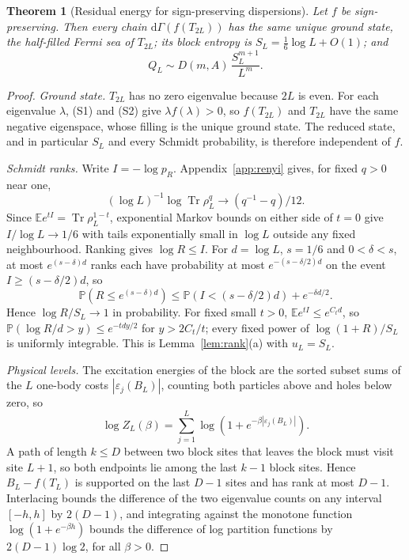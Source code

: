 \documentclass[11pt,a4paper]{article}
\newtheorem{theorem}{Theorem}
\theoremstyle{remark}
\newcommand{\Tr}{\operatorname{Tr}}
\newcommand{\E}{\mathbb E}
\newcommand{\Prob}{\mathbb P}
\newcommand{\dd}{\mathrm d}
\begin{document}
\begin{theorem}[Residual energy for sign-preserving dispersions]\label{thm:general}
Let $f$ be sign-preserving. Then every chain $\dd\Gamma(f(T_{2L}))$ has the same unique ground state, the half-filled Fermi sea of $T_{2L}$; its block entropy is $S_L=\tfrac16\log L+O(1)$; and
\begin{equation}
 Q_L\sim D(m,A)\,\frac{S_L^{m+1}}{L^m}.
 \label{eq:general}
\end{equation}
\end{theorem}
\begin{proof}
\emph{Ground state.} $T_{2L}$ has no zero eigenvalue because $2L$ is even. For each eigenvalue $\lambda$, (S1) and (S2) give $\lambda f(\lambda)>0$, so $f(T_{2L})$ and $T_{2L}$ have the same negative eigenspace, whose filling is the unique ground state. The reduced state, and in particular $S_L$ and every Schmidt probability, is therefore independent of $f$.

\emph{Schmidt ranks.} Write $I=-\log p_R$. Appendix~\ref{app:renyi} gives, for fixed $q>0$ near one,
\[
 (\log L)^{-1}\log\Tr\rho_L^q\longrightarrow (q^{-1}-q)/12 .
\]
Since $\E e^{tI}=\Tr\rho_L^{1-t}$, exponential Markov bounds on either side of $t=0$ give $I/\log L\to1/6$ with tails exponentially small in $\log L$ outside any fixed neighbourhood. Ranking gives $\log R\le I$. For $d=\log L$, $s=1/6$ and $0<\delta<s$, at most $e^{(s-\delta)d}$ ranks each have probability at most $e^{-(s-\delta/2)d}$ on the event $I\ge(s-\delta/2)d$, so
\[
 \Prob(R\le e^{(s-\delta)d})\le \Prob(I<(s-\delta/2)d)+e^{-\delta d/2}.
\]
Hence $\log R/S_L\to1$ in probability. For fixed small $t>0$, $\E e^{tI}\le e^{C_t d}$, so $\Prob(\log R/d>y)\le e^{-tdy/2}$ for $y>2C_t/t$; every fixed power of $\log(1+R)/S_L$ is uniformly integrable. This is Lemma~\ref{lem:rank}(a) with $u_L=S_L$.

\emph{Physical levels.} The excitation energies of the block are the sorted subset sums of the $L$ one-body costs $|\varepsilon_j(B_L)|$, counting both particles above and holes below zero, so
\[
 \log Z_L(\beta)=\sum_{j=1}^L\log(1+e^{-\beta|\varepsilon_j(B_L)|}).
\]
A path of length $k\le D$ between two block sites that leaves the block must visit site $L+1$, so both endpoints lie among the last $k-1$ block sites. Hence $B_L-f(T_L)$ is supported on the last $D-1$ sites and has rank at most $D-1$. Interlacing bounds the difference of the two eigenvalue counts on any interval $[-h,h]$ by $2(D-1)$, and integrating against the monotone function $\log(1+e^{-\beta h})$ bounds the difference of log partition functions by $2(D-1)\log2$, for all $\beta>0$.


\end{proof}
\end{document}
